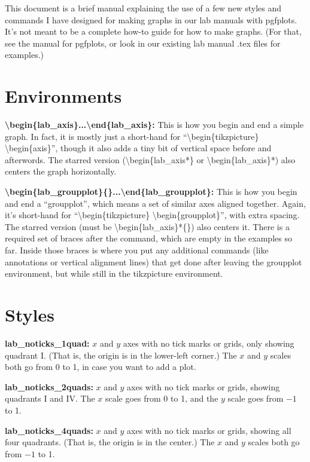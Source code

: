 \documentclass{article}
\begin{document}
This document is a brief manual explaining the use of a few new styles and commands I have designed for making graphs in our lab manuals with pgfplots.  It's not meant to be a complete how-to guide for how to make graphs.  (For that, see the manual for pgfplots, or look in our existing lab manual .tex files for examples.)

\section{Environments}

\textbf{\textbackslash begin\{lab\_axis\}...\textbackslash end\{lab\_axis\}:} This is how you begin and end a simple graph.  In fact, it is mostly just a short-hand for ``\textbackslash begin\{tikzpicture\} \textbackslash begin\{axis\}'', though it also adds a tiny bit of vertical space before and afterwords.  The starred version (\textbackslash begin\{lab\_axis*\} or \textbackslash begin\{lab\_axis\}*) also centers the graph horizontally.

\textbf{\textbackslash begin\{lab\_groupplot\}\{\}...\textbackslash end\{lab\_groupplot\}:} This is how you begin and end a ``groupplot'', which means a set of similar axes aligned together.  Again, it's short-hand for ``\textbackslash begin\{tikzpicture\} \textbackslash begin\{groupplot\}'', with extra spacing.  The starred version (must be \textbackslash begin\{lab\_axis\}*\{\}) also centers it.  There is a required set of braces after the command, which are empty in the examples so far.  Inside those braces is where you put any additional commands (like annotations or vertical alignment lines) that get done after leaving the groupplot environment, but while still in the tikzpicture environment.

\section{Styles}

\textbf{lab\_noticks\_1quad:} $x$ and $y$ axes with no tick marks or grids, only showing quadrant I.  (That is, the origin is in the lower-left corner.)  The $x$ and $y$ scales both go from 0 to 1, in case you want to add a plot.

\textbf{lab\_noticks\_2quads:} $x$ and $y$ axes with no tick marks or grids, showing quadrants I and IV.  The $x$ scale goes from 0 to 1, and the $y$ scale goes from $-1$ to 1.

\textbf{lab\_noticks\_4quads:} $x$ and $y$ axes with no tick marks or grids, showing all four quadrants.  (That is, the origin is in the center.)  The $x$ and $y$ scales both go from $-1$ to 1.
\end{document}
